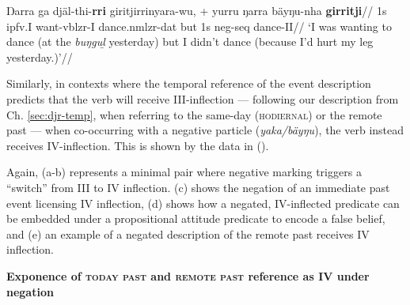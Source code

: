 \a\begingl\gla Ŋarra ga djäl-thi-\textbf{rri} giritjirrinyara-wu, + yurru ŋarra bäyŋu-nha \textbf{girritji}//
\glb 1s \gls{ipfv}.\gls{I} want-\gls{vblzr}-\gls{I} dance.\gls{nmlzr}-\gls{dat} but 1s \gls{neg}-\gls{seq} dance-\gls{II}//
\glft`I was wanting to dance (at the \textit{buŋguḻ} yesterday) but I didn't dance (because I'd hurt my leg yesterday.)'\trailingcitation{[DhG~20190417]}//\endgl
\xe


Similarly, in contexts where the temporal reference of the event description predicts that the verb will receive \gls{III}-inflection --- following our description from Ch. \ref{sec:djr-temp}, when referring to the same-day (\textsc{hodiernal}) or the remote past --- when co-occurring with a negative particle (\textit{yaka/bäyŋu}), the verb instead receives \gls{IV}-inflection. This is shown by the data in ().

 Again, (a-b) represents a minimal pair where negative marking triggers a ``switch'' from \gls{III} to \gls{IV} inflection. (c) shows the negation of an immediate past event licensing \gls{IV} inflection, (d) shows how a negated, \gls{IV}-inflected predicate can be embedded under a propositional attitude predicate to encode a false belief, and (e) an example of a negated description of the remote past receives \gls{IV} inflection.

\pex \textbf{Exponence of \textsc{today past} and \textsc{remote past} reference as \gls{IV} under negation}



